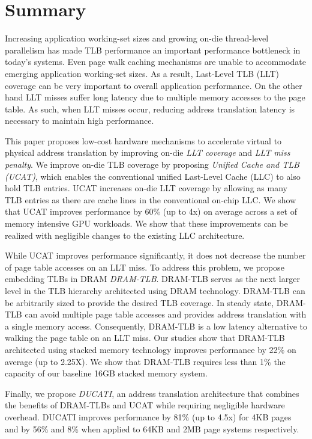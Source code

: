 \section{Summary}

\noindent Increasing application working-set sizes and growing on-die
thread-level parallelism has made TLB performance an important
performance bottleneck in today's systems. Even page walk caching
mechanisms are unable to accommodate emerging application working-set
sizes. As a result, Last-Level TLB (LLT) coverage can be very
important to overall application performance. On the other hand LLT
misses suffer long latency due to multiple memory accesses to the page
table. As such, when LLT misses occur, reducing address translation
latency is necessary to maintain high performance.

This paper proposes low-cost hardware mechanisms to accelerate virtual
to physical address translation by improving on-die {\em LLT coverage}
and {\em LLT miss penalty}. We improve on-die TLB coverage by
proposing {\em Unified Cache and TLB (UCAT)}, which enables the
conventional unified Last-Level Cache (LLC) to also hold TLB entries.
UCAT increases on-die LLT coverage by allowing as many TLB entries as
there are cache lines in the conventional on-chip LLC. We show that
UCAT improves performance by 60\% (up to 4x) on average across a set
of memory intensive GPU workloads. We show that these improvements can
be realized with negligible changes to the existing LLC architecture.


While UCAT improves performance significantly, it does not decrease
the number of page table accesses on an LLT miss. To address this
problem, we propose embedding TLBs in DRAM {\em DRAM-TLB}. DRAM-TLB
serves as the next larger level in the TLB hierarchy architected using
DRAM technology. DRAM-TLB can be arbitrarily sized to provide the
desired TLB coverage. In steady state, DRAM-TLB can avoid multiple
page table accesses and provides address translation with a single
memory access. Consequently, DRAM-TLB is a low latency alternative to
walking the page table on an LLT miss. Our studies show that DRAM-TLB
architected using stacked memory technology improves performance by
22\% on average (up to 2.25X). We show that DRAM-TLB requires less
than 1\% the capacity of our baseline 16GB stacked memory system.

Finally, we propose {\em DUCATI}, an address translation architecture
that combines the benefits of DRAM-TLBs and UCAT while requiring
negligible hardware overhead. DUCATI improves performance by 81\% (up
to 4.5x) for 4KB pages and by 56\% and 8\% when applied to 64KB and
2MB page systems respectively.

% 

